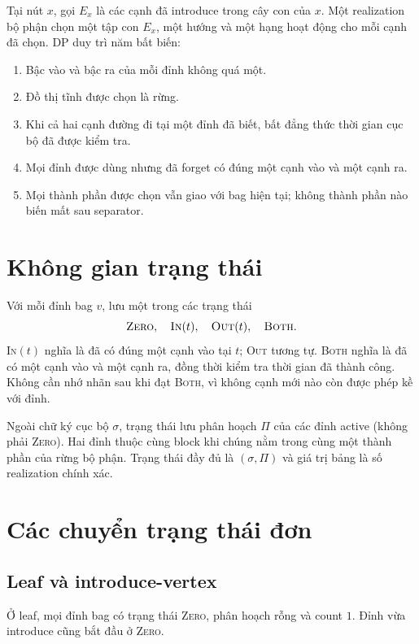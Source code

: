 Tại nút $x$, gọi $E_x$ là các cạnh đã introduce trong cây con của $x$. Một realization bộ phận chọn một tập con $E_x$, một hướng và một hạng hoạt động cho mỗi cạnh đã chọn. DP duy trì năm bất biến:

\begin{enumerate}[label=\textbf{I\arabic*.}]
  \item Bậc vào và bậc ra của mỗi đỉnh không quá một.
  \item Đồ thị tĩnh được chọn là rừng.
  \item Khi cả hai cạnh đường đi tại một đỉnh đã biết, bất đẳng thức thời gian cục bộ đã được kiểm tra.
  \item Mọi đỉnh được dùng nhưng đã forget có đúng một cạnh vào và một cạnh ra.
  \item Mọi thành phần được chọn vẫn giao với bag hiện tại; không thành phần nào biến mất sau separator.
\end{enumerate}

\section{Không gian trạng thái}

Với mỗi đỉnh bag $v$, lưu một trong các trạng thái
\[
  \textsc{Zero},\quad \textsc{In}(t),\quad \textsc{Out}(t),\quad \textsc{Both}.
\]
\textsc{In}$(t)$ nghĩa là đã có đúng một cạnh vào tại $t$; \textsc{Out} tương tự. \textsc{Both} nghĩa là đã có một cạnh vào và một cạnh ra, đồng thời kiểm tra thời gian đã thành công. Không cần nhớ nhãn sau khi đạt \textsc{Both}, vì không cạnh mới nào còn được phép kề với đỉnh.

Ngoài chữ ký cục bộ $\sigma$, trạng thái lưu phân hoạch $\Pi$ của các đỉnh active (không phải \textsc{Zero}). Hai đỉnh thuộc cùng block khi chúng nằm trong cùng một thành phần của rừng bộ phận. Trạng thái đầy đủ là $(\sigma,\Pi)$ và giá trị bảng là số realization chính xác.

\section{Các chuyển trạng thái đơn}

\subsection{Leaf và introduce-vertex}

Ở leaf, mọi đỉnh bag có trạng thái \textsc{Zero}, phân hoạch rỗng và count $1$. Đỉnh vừa introduce cũng bắt đầu ở \textsc{Zero}.

